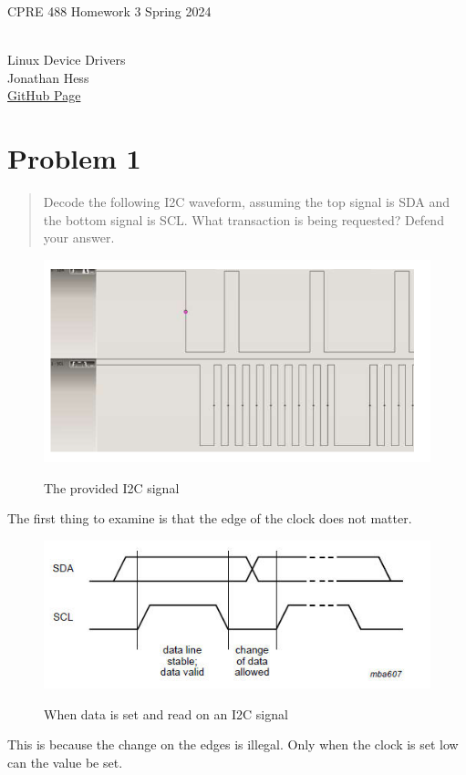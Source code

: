 \documentclass[10pt,a4paper]{article}
\author{}
\date{}
\begin{document}
\begin{flushleft}
\begin{LARGE}CPRE 488 Homework 3 Spring 2024
\end{LARGE}
\\Linux Device Drivers
\\Jonathan Hess
\\\href{https://github.com/Jetsama/CPRE488/tree/main/HW3}{GitHub Page}
\end{flushleft}

\section{Problem 1}
\begin{quote}
Decode the following I2C waveform, assuming the top signal is SDA and the bottom signal is SCL. What
transaction is being requested? Defend your answer.
\end{quote}

\begin{figure}[H]
\centering
\includegraphics[width=5in]{images/Problem1.png} \\
\caption{The provided I2C signal}
\end{figure}
The first thing to examine is that the edge of the clock does not matter.
\begin{figure}[H]
\centering
\includegraphics[width=5in]{images/i2c_bit_trnsf.jpg} \\
\caption{When data is set and read on an I2C signal\cite{jeremy}}
\end{figure}
This is because the change on the edges is illegal. Only when the clock is set low can the value be set.
\end{document}
